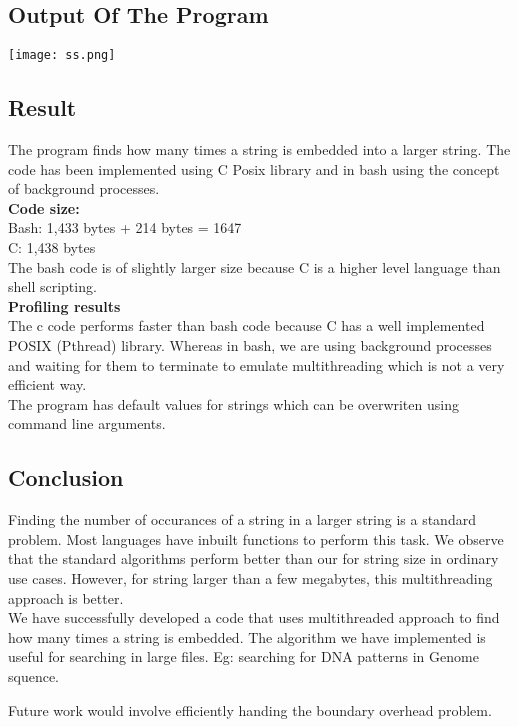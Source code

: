 \documentclass[paper=a4, fontsize=11pt]{scrartcl} %
\numberwithin{equation}{section} %
\numberwithin{figure}{section} %
\numberwithin{table}{section} %
\begin{document}
\subsection{Output Of The Program}
\texttt{[image: ss.png]}


\subsection{Result}
The program finds how many times a string is embedded into a larger string. The code has been implemented using C Posix library and in bash using the concept of background processes.\\

\textbf{Code size:}\\
Bash: 1,433 bytes + 214 bytes = 1647\\
C: 1,438 bytes\\

The bash code is of slightly larger size because C is a higher level language than shell scripting.\\

\textbf{Profiling results}\\

The c code performs faster than bash code because C has a well implemented POSIX (Pthread) library. Whereas in bash, we are using background processes and waiting for them to terminate to emulate multithreading which is not a very efficient way.\\

The program has default values for strings which can be overwriten using command line arguments.

\subsection{Conclusion}
Finding the number of occurances of a string in a larger string is a standard problem. Most languages have inbuilt functions to perform this task. We observe that the standard algorithms perform better than our for string size in ordinary use cases. However, for string larger than a few megabytes, this multithreading approach is better.\\

We have successfully developed a code that uses multithreaded approach to find how many times a string is embedded. The algorithm we have implemented is useful for searching in large files. Eg: searching for DNA patterns in Genome squence. 

Future work would involve efficiently handing the boundary overhead problem.
\end{document}

